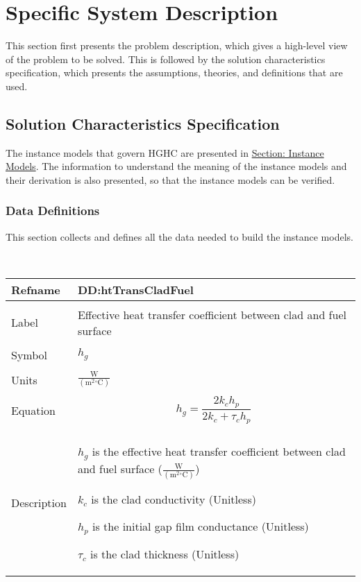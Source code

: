 \documentclass[12pt]{article}
\begin{document}
\section{Specific System Description}
\label{Sec:SpecSystDesc}
This section first presents the problem description, which gives a high-level view of the problem to be solved. This is followed by the solution characteristics specification, which presents the assumptions, theories, and definitions that are used.
\subsection{Solution Characteristics Specification}
\label{Sec:SolCharSpec}
The instance models that govern HGHC are presented in \hyperref[Sec:IMs]{Section: Instance Models}. The information to understand the meaning of the instance models and their derivation is also presented, so that the instance models can be verified.
\subsubsection{Data Definitions}
\label{Sec:DDs}
This section collects and defines all the data needed to build the instance models.
\par~

\noindent \begin{minipage}{\textwidth}
\begin{tabular}{p{} p{}}
\toprule \textbf{Refname} & \textbf{DD:htTransCladFuel}
\label{DD:htTransCladFuel}
\\ \midrule \\
Label & Effective heat transfer coefficient between clad and fuel surface
\\ \midrule \\
Symbol & ${h_{g}}$
\\ \midrule \\
Units & $\frac{\text{W}}{(\text{m}^{2}{}^{\circ}\text{C})}$
\\ \midrule \\
Equation & \begin{displaymath}
           {h_{g}}=\frac{2 {k_{c}} {h_{p}}}{2 {k_{c}}+{τ_{c}} {h_{p}}}
           \end{displaymath}
\\ \midrule \\
Description & \begin{symbDescription}
              \item{${h_{g}}$ is the effective heat transfer coefficient between clad and fuel surface ($\frac{\text{W}}{(\text{m}^{2}{}^{\circ}\text{C})}$)}
              \item{${k_{c}}$ is the clad conductivity (Unitless)}
              \item{${h_{p}}$ is the initial gap film conductance (Unitless)}
              \item{${τ_{c}}$ is the clad thickness (Unitless)}
              \end{symbDescription}
\\ \bottomrule \end{tabular}
\end{minipage}
\par~
\end{document}
